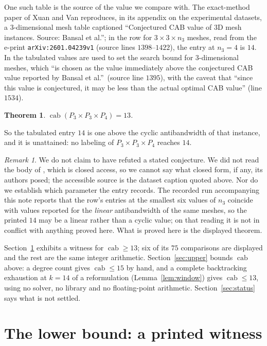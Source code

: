 \documentclass[11pt]{amsart}
\newtheorem{theorem}{Theorem}
\theoremstyle{remark}
\newtheorem*{remark}{Remark}
\DeclareMathOperator{\cab}{cab}
\begin{document}
One such table is the source of the value we compare with. The exact-method paper of Xuan and Van
\cite{XT} reproduces, in its appendix on the experimental datasets, a $3$-dimensional mesh table
captioned ``Conjectured CAB value of 3D mesh instances. Source: Bansal et al.''; in the row for
$3\times3\times n_3$ meshes, read from the e-print \texttt{arXiv:2601.04239v1} (source lines
$1398$--$1422$), the entry at $n_3=4$ is $14$. In \cite{XT} the tabulated values are used to set
the search bound for $3$-dimensional meshes, which ``is chosen as the value immediately above the
conjectured CAB value reported by Bansal et al.''\ (source line $1395$), with the caveat that
``since this value is conjectured, it may be less than the actual optimal CAB value'' (line
$1534$).

\begin{theorem}\label{thm:main}
$\cab(P_3\times P_3\times P_4)=13$.
\end{theorem}

So the tabulated entry $14$ is one above the cyclic antibandwidth of that instance, and it is
unattained: no labeling of $P_3\times P_3\times P_4$ reaches $14$.

\begin{remark}
We do not claim to have refuted a stated conjecture. We did not read the body of \cite{BS}, which
is closed access, so we cannot say what closed form, if any, its authors posed; the accessible
source is the dataset caption quoted above. Nor do we establish which parameter the entry records.
The recorded run accompanying this note reports that the row's entries at the smallest six values
of $n_3$ coincide with values reported for the \emph{linear} antibandwidth of the same meshes, so
the printed $14$ may be a
linear rather than a cyclic value; on that reading it is not in conflict with anything proved here.
What is proved here is the displayed theorem.
\end{remark}

Section~\ref{sec:lower} exhibits a witness for $\cab\ge13$; six of its $75$ comparisons are
displayed and the rest are the same integer arithmetic.
Section~\ref{sec:upper} bounds $\cab$ above: a degree count gives $\cab\le15$ by hand, and a
complete backtracking exhaustion at $k=14$ of a reformulation (Lemma~\ref{lem:window}) gives
$\cab\le13$, using no solver, no library and no floating-point arithmetic.
Section~\ref{sec:status} says what is not settled.

\section{The lower bound: a printed witness}\label{sec:lower}
\end{document}
